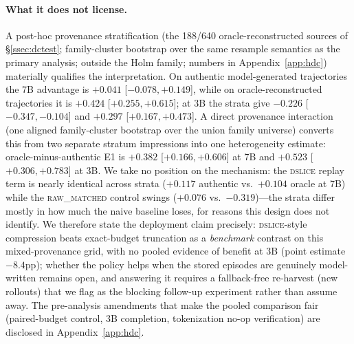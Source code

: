\paragraph{What it does not license.} A post-hoc provenance stratification (the 188/640 oracle-reconstructed sources of \S\ref{ssec:dctest}; family-cluster bootstrap over the same resample semantics as the primary analysis; outside the Holm family; numbers in Appendix~\ref{app:hdc}) materially qualifies the interpretation. On authentic model-generated trajectories the 7B advantage is $+0.041$ [$-0.078,+0.149$], while on oracle-reconstructed trajectories it is $+0.424$ [$+0.255,+0.615$]; at 3B the strata give $-0.226$ [$-0.347,-0.104$] and $+0.297$ [$+0.167,+0.473$]. A direct provenance interaction (one aligned family-cluster bootstrap over the union family universe) converts this from two separate stratum impressions into one heterogeneity estimate: oracle-minus-authentic E1 is $+0.382$ [$+0.166,+0.606$] at 7B and $+0.523$ [$+0.306,+0.783$] at 3B. We take no position on the mechanism: the \textsc{dslice} replay term is nearly identical across strata ($+0.117$ authentic vs.\ $+0.104$ oracle at 7B) while the \textsc{raw\_matched} control swings ($+0.076$ vs.\ $-0.319$)---the strata differ mostly in how much the naive baseline loses, for reasons this design does not identify. We therefore state the deployment claim precisely: \textsc{dslice}-style compression beats exact-budget truncation as a \emph{benchmark} contrast on this mixed-provenance grid, with no pooled evidence of benefit at 3B (point estimate $-8.4$pp); whether the policy helps when the stored episodes are genuinely model-written remains open, and answering it requires a fallback-free re-harvest (new rollouts) that we flag as the blocking follow-up experiment rather than assume away. The pre-analysis amendments that make the pooled comparison fair (paired-budget control, 3B completion, tokenization no-op verification) are disclosed in Appendix~\ref{app:hdc}.
